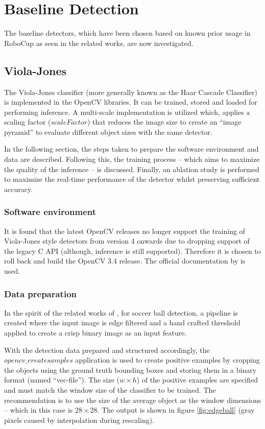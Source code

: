 \documentclass[a4paper,twoside,12pt]{report}
\begin{document}
\section{Baseline Detection}

The baseline detectors, which have been chosen based on known prior usage in RoboCup as seen in the related works, are now investigated.

\subsection{Viola-Jones}

The Viola-Jones classifier (more generally known as the Haar Cascade Classifier) is implemented in the OpenCV libraries. It can be trained, stored and loaded for performing inference. A multi-scale implementation is utilized which, applies a scaling factor ($scaleFactor$) that reduces the image size to create an ``image pyramid'' to evaluate different object sizes with the same detector. 

In the following section, the steps taken to prepare the software environment and data are described. Following this, the training process -- which aims to maximize the quality of the inference -- is discussed. Finally, an ablation study is performed to maximize the real-time performance of the detector whilst preserving sufficient accuracy.

\subsubsection{Software environment}

It is found that the latest OpenCV releases no longer support the training of Viola-Jones style detectors from version 4 onwards due to dropping support of the legacy C API (although, inference is still supported). Therefore it is chosen to roll back and build the OpenCV 3.4 release. The official documentation by \cite{vjdataset} is used.

\subsubsection{Data preparation}

In the spirit of the related works of \cite{robovj}, for soccer ball detection, a pipeline is created where the input image is edge filtered and a hand crafted threshold applied to create a crisp binary image as an input feature. 

With the detection data prepared and structured accordingly, the $opencv\_createsamples$ application is used to create positive examples by cropping the objects using the ground truth bounding boxes and storing them in a binary format (named ``vec-file''). The size ($w\times h$) of the positive examples are specified and must match the window size of the classifier to be trained. The \cite{vjdataset} recommendation is to use the size of the average object as the window dimensions -- which in this case is $28\times 28$. The output is shown in figure \ref{fig:edgeball} (gray pixels caused by interpolation during rescaling).
\end{document}
